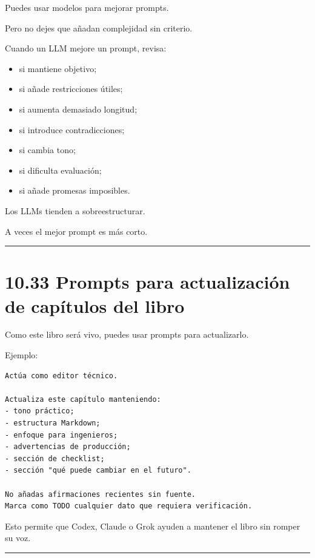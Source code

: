 Puedes usar modelos para mejorar prompts.

Pero no dejes que añadan complejidad sin criterio.

Cuando un LLM mejore un prompt, revisa:

\begin{itemize}
\tightlist
\item
  si mantiene objetivo;
\item
  si añade restricciones útiles;
\item
  si aumenta demasiado longitud;
\item
  si introduce contradicciones;
\item
  si cambia tono;
\item
  si dificulta evaluación;
\item
  si añade promesas imposibles.
\end{itemize}

Los LLMs tienden a sobreestructurar.

A veces el mejor prompt es más corto.

\begin{center}\rule{0.5\linewidth}{0.5pt}\end{center}

\section{10.33 Prompts para actualización de capítulos del
libro}\label{prompts-para-actualizaciuxf3n-de-capuxedtulos-del-libro}

Como este libro será vivo, puedes usar prompts para actualizarlo.

Ejemplo:

\begin{lstlisting}
Actúa como editor técnico.

Actualiza este capítulo manteniendo:
- tono práctico;
- estructura Markdown;
- enfoque para ingenieros;
- advertencias de producción;
- sección de checklist;
- sección "qué puede cambiar en el futuro".

No añadas afirmaciones recientes sin fuente.
Marca como TODO cualquier dato que requiera verificación.
\end{lstlisting}

Esto permite que Codex, Claude o Grok ayuden a mantener el libro sin
romper su voz.

\begin{center}\rule{0.5\linewidth}{0.5pt}\end{center}

